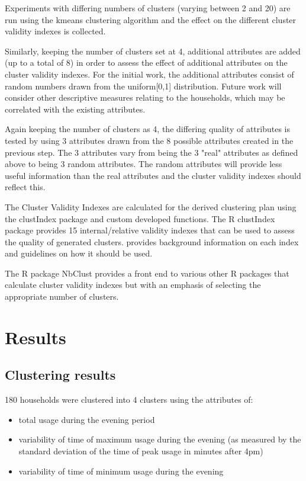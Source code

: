 \documentclass[conference]{IEEEtran}
\begin{document}
Experiments with differing numbers of clusters (varying between 2 and 20) are run using the kmeans clustering algorithm and the effect on the different cluster validity indexes is collected.

Similarly, keeping the number of clusters set at 4, additional attributes are added (up to a total of 8) in order to assess the effect of additional attributes on the cluster validity indexes. For the initial work, the additional attributes consist of random numbers drawn from the uniform[0,1] distribution. Future work will consider other descriptive measures relating to the households, which may be correlated with the existing attributes.

Again keeping the number of clusters as 4, the differing quality of attributes is tested by using 3 attributes drawn from the 8 possible attributes created in the previous step. The 3 attributes vary from being the 3 "real" attributes as defined above to being 3 random attributes. The random attributes will provide less useful information than the real attributes and the cluster validity indexes should reflect this.

The Cluster Validity Indexes are calculated for the derived clustering plan using the clustIndex package and custom developed functions. The R clustIndex package provides 15 internal/relative validity indexes that can be used to assess the quality of generated clusters. \cite{dimitriadou2002examination} provides background information on each index and guidelines on how it should be used.

The R package NbClust \cite{charrad2012package} provides a front end to various other R packages that calculate cluster validity indexes but with an emphasis of selecting the appropriate number of clusters.

\section{Results}

\subsection{Clustering results}
180 households were clustered into 4 clusters using the attributes of:
\begin{itemize}
\item total usage during the evening period
\item variability of time of maximum usage during the evening (as measured by the standard deviation of the time of peak usage in minutes after 4pm)
\item variability of time of minimum usage during the evening
\end{itemize}
\end{document}
